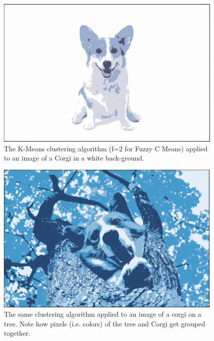 \documentclass[10pt,twocolumn]{article}
\begin{document}
\begin{figure}[h]
 \centering
 \includegraphics[scale=0.2]{corgi-white.png}
 \vspace{20px}
 \caption{The K-Means clustering algorithm (f=2 for Fuzzy C Means) applied to an image of a Corgi in a white back-ground.}
 \label{corgi:white}
\end{figure}

\begin{figure}[h]
 \centering
 \includegraphics[scale=0.2]{corgi-tree.png}
 \vspace{20px}
 \caption{The same clustering algorithm applied to an image of a corgi on a tree. Note how pixels (i.e. colors) of the tree and Corgi get grouped together.}
 \label{corgi:tree}
\end{figure}
\end{document}
